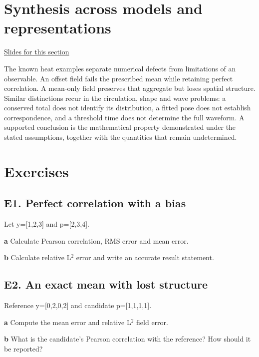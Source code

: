 \documentclass[11pt,letterpaper]{article}
\theoremstyle{definition}\newtheorem{definition}{Definition}\newtheorem{example}{Example}
\numberwithin{equation}{section}
\begin{document}
\section{Synthesis across models and representations}
\hypertarget{note-synthesis-across-models-and-representations}{}\label{note:synthesis-across-models-and-representations}
{\small \href{slides.html\#frame=a-precise-synthesis\&step=1}{Slides for this section}}\par


The known heat examples separate numerical defects from limitations of an observable. An offset field fails the prescribed mean while retaining perfect correlation. A mean-only field preserves that aggregate but loses spatial structure. Similar distinctions recur in the circulation, shape and wave problems: a conserved total does not identify its distribution, a fitted pose does not establish correspondence, and a threshold time does not determine the full waveform. A supported conclusion is the mathematical property demonstrated under the stated assumptions, together with the quantities that remain undetermined.
\bigskip
\section*{Exercises}
\par\noindent\begin{minipage}{\linewidth}
\subsection*{E1. Perfect correlation with a bias}
Let y=\allowbreak{}[1,2,3] and p=\allowbreak{}[2,3,4].

\textbf{a} Calculate Pearson correlation, RMS error and mean error.

\end{minipage}\par\medskip
\textbf{b} Calculate relative L$^2$ error and write an accurate result statement.

\par\noindent\begin{minipage}{\linewidth}
\subsection*{E2. An exact mean with lost structure}
Reference y=\allowbreak{}[0,2,0,2] and candidate p=\allowbreak{}[1,1,1,1].

\textbf{a} Compute the mean error and relative L$^2$ field error.

\end{minipage}\par\medskip
\textbf{b} What is the candidate's Pearson correlation with the reference? How should it be reported?
\end{document}
